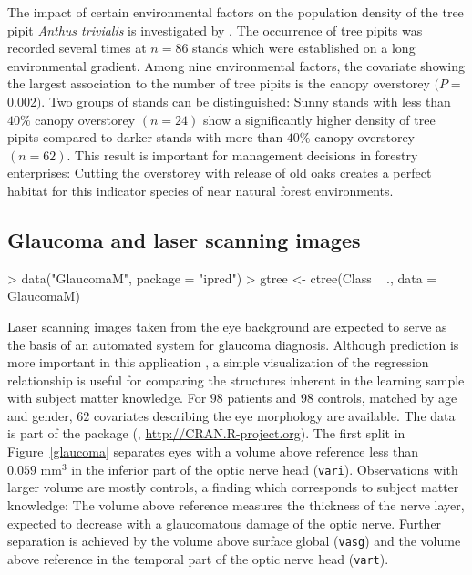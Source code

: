 \documentclass{Z}
\begin{document}
The impact of certain environmental factors on the population density of the 
tree pipit \textit{Anthus trivialis} 
is investigated by \cite{MuellerHothorn2004}.
The occurrence of tree pipits was recorded several times at
$n = 86$ stands which were established on a long environmental gradient. 
Among nine environmental factors, 
the covariate showing the largest association to the number of tree pipits
is the canopy overstorey $(P = $0.002$)$. 
Two groups of stands can be distinguished: Sunny stands with less than $40\%$
canopy overstorey $(n = 24)$ show a
significantly higher density of tree pipits compared to darker stands with more than
$40\%$ canopy overstorey $(n = 62)$.
This result is important for management decisions
in forestry enterprises: Cutting the overstorey with release of old
oaks creates a perfect habitat for this indicator species
of near natural forest environments. 

\subsection{Glaucoma and laser scanning images}

\begin{Schunk}
\begin{Sinput}
> data("GlaucomaM", package = "ipred")
> gtree <- ctree(Class ~ ., data = GlaucomaM)
\end{Sinput}
\end{Schunk}


Laser scanning images taken from the eye background are expected to serve as 
the basis of an automated system for glaucoma diagnosis. 
Although prediction is more important in this application
\citep{new-glauco:2003}, a simple
visualization of the regression relationship is useful for comparing the
structures inherent in the learning sample with subject matter knowledge. 
For $98$ patients and $98$ controls, matched by age
and gender, $62$ covariates describing the eye morphology are available. The
data is part of the 
 package
(\cite{Rnews:Peters+Hothorn+Lausen:2002}, \url{http://CRAN.R-project.org}).
The first split in Figure~\ref{glaucoma} separates eyes with a volume 
above reference less than
$0.059 \text{ mm}^3$ in the inferior part of the
optic nerve head (\texttt{vari}). 
Observations with larger volume are mostly controls, a finding which
corresponds to subject matter knowledge: The volume above reference measures the
thickness of the nerve layer, expected to decrease with a glaucomatous
damage of the optic nerve. Further separation is achieved by the volume
above surface global (\texttt{vasg}) and the volume above reference in the
temporal part of the optic nerve head (\texttt{vart}).
\end{document}
